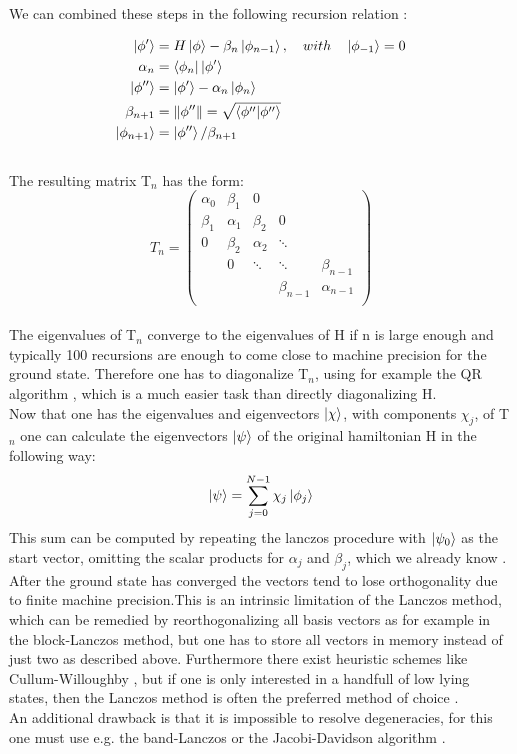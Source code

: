\documentclass{article}
\begin{document}
We can combined these steps in the following recursion relation \cite{Fehske}:

\begin{align*}
\ket{\phi'}&=H\ket{\phi} - \beta_n\ket{\phi_{n-1}}, \quad with \quad \ket{\phi_{-1}} = 0\\
\alpha_n &= \bra{\phi_n} \ket{\phi'}\\
\ket{\phi''} &= \ket{\phi'} - \alpha_n\ket{\phi_n}\\
\beta_{n+1} &= \|\phi''\| = \sqrt{\braket{\phi''|\phi''}}\\
\ket{\phi_{n+1}} &= \ket{\phi''}/\beta_{n+1}
\end{align*}\\
The resulting matrix T$_n$ has the form:\\
\begin{equation*}
T_n = 
\begin{pmatrix}
\alpha_0 & \beta_1 & 0 & &\\
\beta_1 & \alpha_1 & \beta_2 & 0 &\\
0 & \beta_2 & \alpha_2 & \ddots & \\
 & 0 & \ddots & \ddots & \beta_{n-1}\\
 & & & \beta_{n-1} & \alpha_{n-1}\\
\end{pmatrix}
\end{equation*}\\
The eigenvalues of T$_n$ converge to the eigenvalues of H if n is
large enough and typically 100 recursions are enough to come close to
machine precision for the ground state. Therefore one has to
diagonalize T$_n$, using for example the QR algorithm \cite{Francis1,Francis2}, which is a much
easier task than directly diagonalizing H.\\
Now that one has the eigenvalues and eigenvectors $\ket{\chi}$, with
components $\chi_j$, of
T$_n$ one can calculate the eigenvectors $\ket{\psi}$ of the original
hamiltonian H in the following way:
\begin{equation}
\label{eq:15}
\ket{\psi} = \sum\limits_{j=0}^{N-1} \chi_j \ket{\phi_j}
\end{equation}
This sum can be computed by repeating the lanczos procedure with
$\ket{\psi_0}$ as the start vector, omitting the scalar products for $\alpha_j$ and
$\beta_j$, which we already know \cite{Fehske}.\\
After the ground state has converged the vectors tend to lose
orthogonality due to finite machine precision.This is an intrinsic
limitation of the Lanczos method, which can be remedied by
reorthogonalizing all basis vectors as for example in the block-Lanczos
method, but one has to store all vectors in memory instead of just two
as described above. Furthermore there exist heuristic schemes like
Cullum-Willoughby \cite{Cullum2,Cullum}, but if one is only interested in a handfull of low
lying states, then the Lanczos method is often the preferred method of
choice \cite{Noack}.\\
An additional drawback is that it is impossible to resolve
degeneracies, for this one must use e.g. the band-Lanczos or the
Jacobi-Davidson algorithm \cite{Fehske}.\\ 
\end{document}
